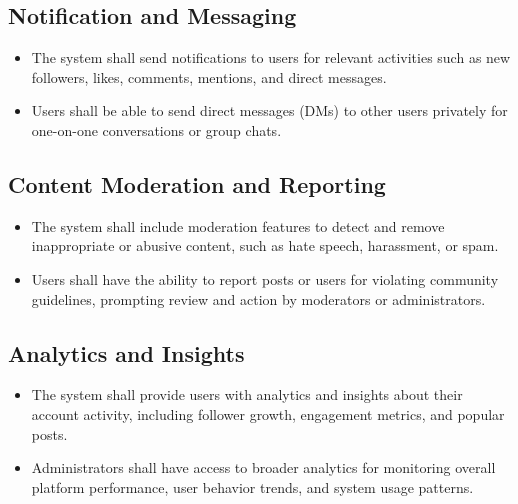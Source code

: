 \documentclass{article}
\begin{document}
\subsection{Notification and Messaging}
\begin{itemize}[label=$\bullet$]
    \item The system shall send notifications to users for relevant activities such as new followers, likes, comments, mentions, and direct messages.
    \item Users shall be able to send direct messages (DMs) to other users privately for one-on-one conversations or group chats.
\end{itemize}

\subsection{Content Moderation and Reporting}
\begin{itemize}[label=$\bullet$]
    \item The system shall include moderation features to detect and remove inappropriate or abusive content, such as hate speech, harassment, or spam.
    \item Users shall have the ability to report posts or users for violating community guidelines, prompting review and action by moderators or administrators.
\end{itemize}

\subsection{Analytics and Insights}
\begin{itemize}[label=$\bullet$]
    \item The system shall provide users with analytics and insights about their account activity, including follower growth, engagement metrics, and popular posts.
    \item Administrators shall have access to broader analytics for monitoring overall platform performance, user behavior trends, and system usage patterns.
\end{itemize}
\end{document}

